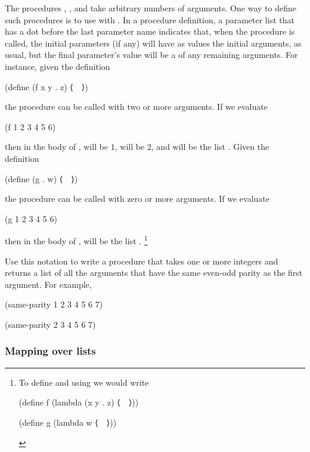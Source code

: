 \begin{exercise}
	\label{Exercise 2.20}
	The procedures \code{+}, \code{*}, and  take arbitrary numbers of arguments.
	One way to define such procedures is to use  with .
	In a procedure definition, a parameter list that has a dot before the last parameter name indicates that, when the procedure is called, the initial parameters (if any) will have as values the initial arguments, as usual, but the final parameter’s value will be a  of any remaining arguments.
	For instance, given the definition
	\begin{scheme}
	  (define (f x y . z) ⟨~~⟩)
	\end{scheme}
	the procedure  can be called with two or more arguments.
	If we evaluate
	\begin{scheme}
	  (f 1 2 3 4 5 6)
	\end{scheme}
	then in the body of ,  will be \( 1 \),  will be \( 2 \), and  will be the list \code{(3 4 5 6)}.
	Given the definition
	\begin{scheme}
	  (define (g . w) ⟨~~⟩)
	\end{scheme}
	the procedure  can be called with zero or more arguments.
	If we evaluate
	\begin{scheme}
	  (g 1 2 3 4 5 6)
	\end{scheme}
	then in the body of ,  will be the list .%
	\footnote{
		To define  and  using  we would write
		\begin{smallscheme}
		  (define f (lambda (x y . z) ⟨~\var{body}~⟩))

		  (define g (lambda w ⟨~\var{body}~⟩))
		\end{smallscheme}
	}

	Use this notation to write a procedure  that takes one or more integers and returns a list of all the arguments that have the same even-odd parity as the first argument.
	For example,
	\begin{scheme}
	  (same-parity 1 2 3 4 5 6 7)
	  ~\outprint{(1 3 5 7)}~

	  (same-parity 2 3 4 5 6 7)
	  ~\outprint{(2 4 6)}~
	\end{scheme}
\end{exercise}



\subsubsection*{Mapping over lists}

